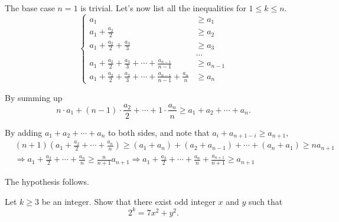 \documentclass{article}
\begin{document}
\begin{soln}
    The base case $n=1$ is trivial. Let's now list all the inequalities for $1 \le k \le n.$
    \[
        \begin{cases}
            a_1 &\ge a_1\\
            a_1 + \frac{a_2}{2} &\ge a_2\\
            a_1 + \frac{a_2}{2} + \frac{a_3}{3} &\ge a_3\\
            &\ldots\\
            a_1 + \frac{a_2}{2} + \frac{a_3}{3} + \cdots + \frac{a_{n-1}}{n-1} &\ge a_{n-1}\\
            a_1 + \frac{a_2}{2} + \frac{a_3}{3} + \cdots + \frac{a_{n-1}}{n-1} + \frac{a_n}{n} &\ge a_n
        \end{cases}
    \]
    
    By summing up
    \[
        n \cdot a_1 + (n-1) \cdot \frac{a_2}{2} + \cdots + 1 \cdot \frac{a_n}{n} \ge a_1 + a_2 + \cdots + a_n.
    \]

    By adding $a_1 + a_2 + \cdots + a_n$ to both sides, and note that $a_i + a_{n+1-i} \ge a_{n+1},$
    \[
        \begin{aligned}
            &(n+1) \left( a_1 + \frac{a_2}{2} + \cdots + \frac{a_n}{n} \right) \ge (a_1+a_{n}) + (a_2+a_{n-1}) + \cdots + (a_n+a_1) \ge na_{n+1}\\
            &\Rightarrow a_1 + \frac{a_2}{2} + \cdots + \frac{a_n}{n} \ge \frac{n}{n+1} a_{n+1}
            \Rightarrow a_1 + \frac{a_2}{2} + \cdots + \frac{a_n}{n} + \frac{a_{n+1}}{n+1} \ge a_{n+1}
        \end{aligned}
    \]

    The hypothesis follows.
\end{soln}

\begin{problem}
    Let $k \ge 3$ be an integer. Show that there exist odd integer $x$ and $y$ such that 
    \[
        2^k = 7x^2 + y^2.
    \]
\end{problem}
\end{document}

